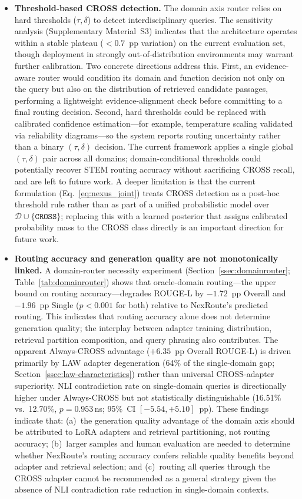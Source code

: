 \documentclass[a4paper,fleql,doubleblind]{cas-sc}
\begin{document}
\begin{itemize}
\item \textbf{Threshold-based CROSS detection.} The domain axis router relies on hard thresholds ($\tau, \delta$) to detect
interdisciplinary queries. The sensitivity analysis (Supplementary Material~S3)
indicates that the architecture operates within a stable plateau ($< 0.7$~pp
variation) on the current evaluation set, though deployment in strongly
out-of-distribution environments may warrant further calibration. Two concrete directions address this. First, an evidence-aware router would
condition its domain and function decision not only on the query but also on
the distribution of retrieved candidate passages, performing a lightweight
evidence-alignment check before committing to a final routing decision.
Second, hard thresholds could be replaced with calibrated confidence
estimation---for example, temperature scaling validated via reliability
diagrams---so the system reports routing uncertainty rather than a binary
$(\tau, \delta)$ decision.
The current framework applies a single global $(\tau, \delta)$ pair across all
domains; domain-conditional thresholds could potentially recover STEM
routing accuracy without sacrificing CROSS recall, and are left to
future work.
A deeper limitation is that the current formulation (Eq.~\ref{eq:nexus_joint}) treats CROSS detection
as a post-hoc threshold rule rather than as part of a unified probabilistic model over
$\mathcal{D} \cup \{\texttt{CROSS}\}$; replacing this with a learned posterior
that assigns calibrated probability mass to the CROSS class directly
is an important direction for future work.
\item \textbf{Routing accuracy and generation quality are not monotonically linked.}
A domain-router necessity experiment (Section~\ref{ssec:domainrouter};
Table~\ref{tab:domainrouter}) shows that oracle-domain routing---the upper bound on
routing accuracy---degrades ROUGE-L by $-1.72$~pp Overall and $-1.96$~pp Single
($p{<}0.001$ for both) relative to NexRoute's predicted routing.
This indicates that routing accuracy alone does not determine generation quality;
the interplay between adapter training distribution, retrieval partition composition,
and query phrasing also contributes.
The apparent Always-CROSS advantage ($+6.35$~pp Overall ROUGE-L) is driven primarily
by LAW adapter degeneration (64\% of the single-domain gap;
Section~\ref{ssec:law-characteristics}) rather than universal CROSS-adapter superiority.
NLI contradiction rate on single-domain queries is directionally higher under Always-CROSS
but not statistically distinguishable (16.51\% vs.\ 12.70\%, $p{=}0.953$\,\textsf{ns};
95\%~CI $[-5.54,{+}5.10]$~pp).
These findings indicate that: (a)~the generation quality advantage of the domain
axis should be attributed to LoRA adapters and retrieval partitioning, not routing
accuracy; (b)~larger samples and human evaluation are needed to determine whether
NexRoute's routing accuracy confers reliable quality benefits beyond adapter and
retrieval selection; and (c)~routing all queries through the CROSS adapter cannot
be recommended as a general strategy given the absence of NLI contradiction rate reduction
in single-domain contexts.


\end{itemize}
\end{document}
